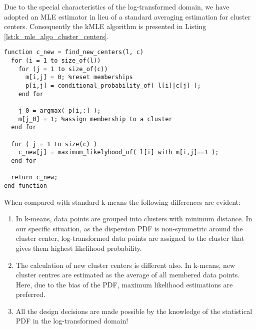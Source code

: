 Due to the special characteristics of the log-transformed domain, we have adopted
an MLE estimator in lieu of a standard averaging estimation for cluster centers. 
Consequently the kMLE algorithm is presented in Listing \ref{lst:k_mle_algo_cluster_centers}.

\lstset{language=Matlab,caption=Iteratively find better cluster centers,label=lst:k_mle_algo_cluster_centers}
\begin{lstlisting}[frame=tb]
function c_new = find_new_centers(l, c)
  for (i = 1 to size_of(l))
    for (j = 1 to size_of(c))
      m[i,j] = 0; %reset memberships
      p[i,j] = conditional_probability_of( l[i]|c[j] );
    end for
   
    j_0 = argmax( p[i,:] );
    m[j_0] = 1; %assign membership to a cluster
  end for

  for ( j = 1 to size(c) )
    c_new[j] = maximum_likelyhood_of( l[i] with m[i,j]==1 );
  end for

  return c_new;
end function
\end{lstlisting}

When compared with standard k-means the following differences are evident:
\begin{enumerate}
  \item In k-means, data points are grouped into clusters with minimum distance. 
In our specific situation, as the dispersion PDF is non-symmetric around the cluster center, log-transformed data points are assigned to the cluster that gives them highest likelihood probability.
  \item The calculation of new cluster centers is different also. 
In k-means, new cluster centres are estimated as the average of all membered data points. 
Here, due to the bias of the PDF, maximum likelihood estimations are preferred.
  \item All the design decisions are made possible by the knowledge of the statistical PDF in the log-transformed domain!
\end{enumerate}

